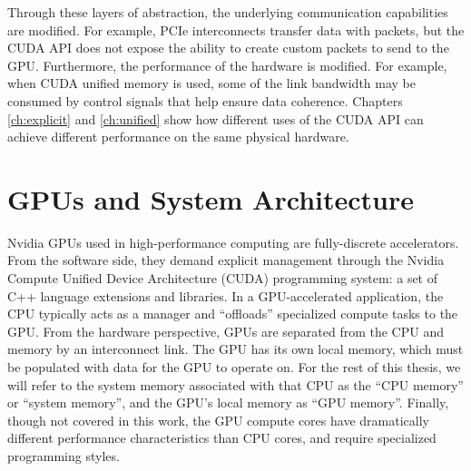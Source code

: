 Through these layers of abstraction, the underlying communication capabilities are modified.
For example, PCIe interconnects transfer data with packets, but the CUDA API does not expose the ability to create custom packets to send to the GPU.
Furthermore, the performance of the hardware is modified.
For example, when CUDA unified memory is used, some of the link bandwidth may be consumed by control signals that help ensure data coherence.
Chapters \ref{ch:explicit} and \ref{ch:unified} show how different uses of the CUDA API can achieve different performance on the same physical hardware.

\section{GPUs and System Architecture}
\label{sec:gpu-sys-arch}

Nvidia GPUs used in high-performance computing are fully-discrete accelerators.
From the software side, they demand explicit management through the Nvidia Compute Unified Device Architecture (CUDA) programming system: a set of C++ language extensions and libraries.
In a GPU-accelerated application, the CPU typically acts as a manager and ``offloads'' specialized compute tasks to the GPU.
From the hardware perspective, GPUs are separated from the CPU and memory by an interconnect link.
The GPU has its own local memory, which must be populated with data for the GPU to operate on.
For the rest of this thesis, we will refer to the system memory associated with that CPU as the ``CPU memory'' or ``system memory'', and the GPU's local memory as ``GPU memory''.
Finally, though not covered in this work, the GPU compute cores have dramatically different performance characteristics than CPU cores, and require specialized programming styles.

